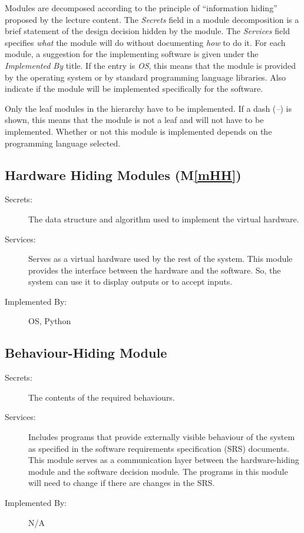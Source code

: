 \documentclass[12pt, titlepage]{article}
\newcommand{\mref}[1]{M\ref{#1}}
\begin{document}
Modules are decomposed according to the principle of ``information hiding''
proposed by the lecture content. The \emph{Secrets} field in a module
decomposition is a brief statement of the design decision hidden by the
module. The \emph{Services} field specifies \emph{what} the module will do
without documenting \emph{how} to do it. For each module, a suggestion for the
implementing software is given under the \emph{Implemented By} title. If the
entry is \emph{OS}, this means that the module is provided by the operating
system or by standard programming language libraries.  Also indicate if the
module will be implemented specifically for the software.

Only the leaf modules in the
hierarchy have to be implemented. If a dash (\emph{--}) is shown, this means
that the module is not a leaf and will not have to be implemented. Whether or
not this module is implemented depends on the programming language
selected.

\subsection{Hardware Hiding Modules (\mref{mHH})}

\begin{description}
\item[Secrets:]The data structure and algorithm used to implement the virtual
  hardware.
\item[Services:]Serves as a virtual hardware used by the rest of the
  system. This module provides the interface between the hardware and the
  software. So, the system can use it to display outputs or to accept inputs.
\item[Implemented By:] OS, Python
\end{description}

\subsection{Behaviour-Hiding Module}

\begin{description}
\item[Secrets:]The contents of the required behaviours.
\item[Services:]Includes programs that provide externally visible behaviour of
  the system as specified in the software requirements specification (SRS)
  documents. This module serves as a communication layer between the
  hardware-hiding module and the software decision module. The programs in this
  module will need to change if there are changes in the SRS.
\item[Implemented By:] N/A
\end{description}
\end{document}
